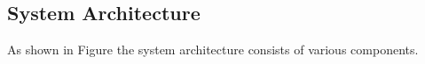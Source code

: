 \subsection{System Architecture}
As shown in Figure the system architecture consists of various components.



%




%         
